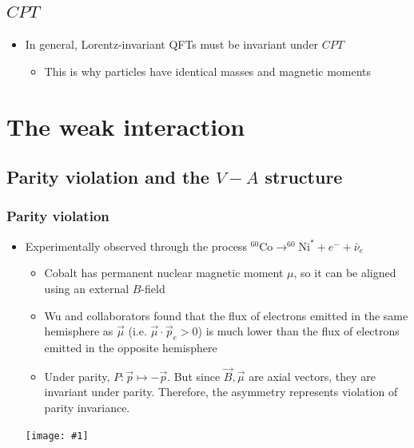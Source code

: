 \documentclass[11pt]{article}
\newcommand{\nubar}{{\bar{\nu}}}
\newcommand{\el}{\ensuremath{e^{-}}}
\newcommand{\embedimgw}[2]{\begin{center}\texttt{[image: \#1]}\end{center}}
\begin{document}
\subsection{$CPT$}
\begin{itemize}
  \item In general, Lorentz-invariant QFTs must be invariant under $CPT$
  \begin{itemize}
    \item This is why particles have identical masses and magnetic moments
  \end{itemize}
\end{itemize}


\section{The weak interaction}
\subsection{Parity violation and the $V-A$ structure}
\subsubsection{Parity violation}
\begin{itemize}
  \item Experimentally observed through the process $^{60}\text{Co}\rightarrow^{60}\text{Ni}^* + \el + \nubar_e$
  \begin{itemize}
    \item Cobalt has permanent nuclear magnetic moment $\mu$, so it can be aligned using an external $B$-field
    \item Wu and collaborators found that the flux of electrons emitted in the same hemisphere as $\vec\mu$ (i.e. $\vec\mu\cdot \vec p_e>0$) is much lower than the flux of electrons emitted in the opposite hemisphere
    \item Under parity, $P:\vec p \mapsto - \vec p$. But since $\vec B,\vec \mu$ are axial vectors, they are invariant under parity. Therefore, the asymmetry represents violation of parity invariance.
  \end{itemize}
  \embedimgw{figs/wu.png}{.4}
\end{itemize}
\end{document}
